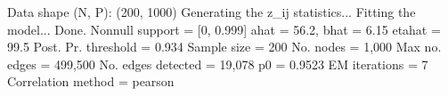 Data shape (N, P): (200, 1000)
Generating the z_ij statistics...
Fitting the model...
Done.
Nonnull support = [0, 0.999]
ahat = 56.2,  bhat = 6.15
etahat = 99.5
Post. Pr. threshold = 0.934
Sample size = 200
No. nodes = 1,000
Max no. edges = 499,500
No. edges detected = 19,078
p0 = 0.9523
EM iterations = 7
Correlation method = pearson
